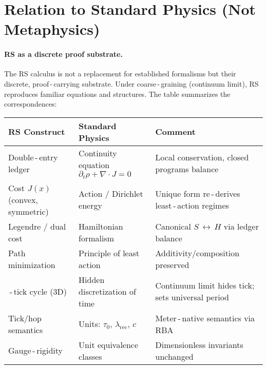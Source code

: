 \documentclass[11pt]{article}
\newcommand{\lamrec}{\lambda_{\mathrm{rec}}}
\newcommand{\tauzero}{\tau_{0}}
\theoremstyle{remark}
\begin{document}
\section{Relation to Standard Physics (Not Metaphysics)}
\paragraph{RS as a discrete proof substrate.}
The RS calculus is not a replacement for established formalisms but their discrete, proof\,\mbox{-}\,carrying substrate. Under coarse\,\mbox{-}\,graining (continuum limit), RS reproduces familiar equations and structures. The table summarizes the correspondences:

\begin{table}[h!]
\centering
\renewcommand{\arraystretch}{1.2}
\setlength{\tabcolsep}{6pt}
\begin{tabularx}{\textwidth}{|>{\raggedright\arraybackslash}X|>{\raggedright\arraybackslash}X|>{\raggedright\arraybackslash}X|}
\hline
\textbf{RS Construct} & \textbf{Standard Physics} & \textbf{Comment} \\
\hline
Double\,\mbox{-}\,entry ledger & Continuity equation $\partial_{t}\rho+\nabla\!\cdot J=0$ & Local conservation, closed programs balance \\
\hline
Cost $J(x)$ (convex, symmetric) & Action / Dirichlet energy & Unique form re\,\mbox{-}\,derives least\,\mbox{-}\,action regimes \\
\hline
Legendre / dual cost & Hamiltonian formalism & Canonical $S\,\leftrightarrow\,H$ via ledger balance \\
\hline
Path minimization & Principle of least action & Additivity/composition preserved \\
\hline
8\,\mbox{-}\,tick cycle (3D) & Hidden discretization of time & Continuum limit hides tick; sets universal period \\
\hline
Tick/hop semantics & Units: $\tauzero$, $\lamrec$, $c$ & Meter\,\mbox{-}\,native semantics via RBA \\
\hline
Gauge\,\mbox{-}\,rigidity & Unit equivalence classes & Dimensionless invariants unchanged \\
\hline
\end{tabularx}
\end{table}
\end{document}
